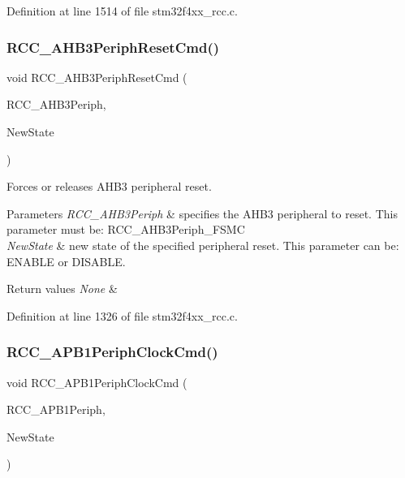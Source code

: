 Definition at line 1514 of file stm32f4xx\+\_\+rcc.\+c.

\mbox{\label{group___r_c_c_gaee44f159a1ca9ebdd7117bff387cd592}} 
\subsubsection{\texorpdfstring{R\+C\+C\+\_\+\+A\+H\+B3\+Periph\+Reset\+Cmd()}{RCC\_AHB3PeriphResetCmd()}}
{\footnotesize\ttfamily void R\+C\+C\+\_\+\+A\+H\+B3\+Periph\+Reset\+Cmd (\begin{DoxyParamCaption}\item[{uint32\+\_\+t}]{R\+C\+C\+\_\+\+A\+H\+B3\+Periph,  }\item[{Functional\+State}]{New\+State }\end{DoxyParamCaption})}



Forces or releases A\+H\+B3 peripheral reset. 


\begin{DoxyParams}{Parameters}
{\em R\+C\+C\+\_\+\+A\+H\+B3\+Periph} & specifies the A\+H\+B3 peripheral to reset. This parameter must be\+: R\+C\+C\+\_\+\+A\+H\+B3\+Periph\+\_\+\+F\+S\+MC \\
\hline
{\em New\+State} & new state of the specified peripheral reset. This parameter can be\+: E\+N\+A\+B\+LE or D\+I\+S\+A\+B\+LE. \\
\hline
\end{DoxyParams}

\begin{DoxyRetVals}{Return values}
{\em None} & \\
\hline
\end{DoxyRetVals}


Definition at line 1326 of file stm32f4xx\+\_\+rcc.\+c.

\mbox{\label{group___r_c_c_gaee7cc5d73af7fe1986fceff8afd3973e}} 
\subsubsection{\texorpdfstring{R\+C\+C\+\_\+\+A\+P\+B1\+Periph\+Clock\+Cmd()}{RCC\_APB1PeriphClockCmd()}}
{\footnotesize\ttfamily void R\+C\+C\+\_\+\+A\+P\+B1\+Periph\+Clock\+Cmd (\begin{DoxyParamCaption}\item[{uint32\+\_\+t}]{R\+C\+C\+\_\+\+A\+P\+B1\+Periph,  }\item[{Functional\+State}]{New\+State }\end{DoxyParamCaption})}



